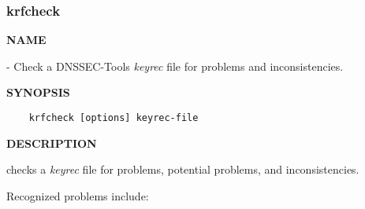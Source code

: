 \clearpage

\subsubsection{\bf krfcheck}

{\bf NAME}

 - Check a DNSSEC-Tools {\it keyrec} file for problems and
inconsistencies.

{\bf SYNOPSIS}

\begin{verbatim}
    krfcheck [options] keyrec-file
\end{verbatim}

{\bf DESCRIPTION}

 checks a {\it keyrec} file for problems, potential problems,
and inconsistencies.

Recognized problems include:

